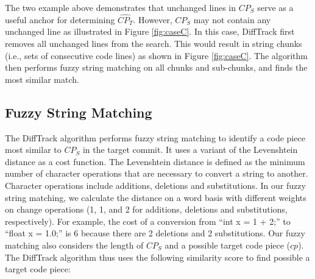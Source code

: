


The two example above demonstrates that unchanged lines in $CP_S$ serve as a useful anchor for determining $\widehat{CP_T}$.
However, $CP_S$ may not contain any unchanged line as illustrated in Figure \ref{fig:caseC}.
In this case, DiffTrack first removes all unchanged lines from the search.
This would result in string chunks (i.e., sets of consecutive code lines) as shown in Figure \ref{fig:caseC}.
The algorithm then performs fuzzy string matching on all chunks and sub-chunks, and finds the most similar match.

\subsection{Fuzzy String Matching}
The DiffTrack algorithm performs fuzzy string matching to identify a code piece most similar to $CP_S$ in the target commit.
It uses a variant of the Levenshtein distance as a cost function.
The Levenshtein distance is defined as the minimum number of character operations that are necessary to convert a string to another.
Character operations include additions, deletions and substitutions.
In our fuzzy string matching, we calculate the distance on a word basis with different weights on change operations (1, 1, and 2 for additions, deletions and substitutions, respectively).
For example, the cost of a conversion from ``int x = 1 + 2;'' to ``float x = 1.0;'' is 6 because there are 2 deletions and 2 substitutions.
Our fuzzy matching also considers the length of $CP_S$ and a possible target code piece ($cp$).
The DiffTrack algorithm thus uses the following similarity score to find possible a target code piece:


